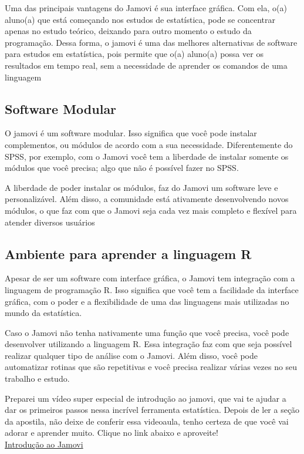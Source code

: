 Uma das principais vantagens do Jamovi é sua interface gráfica. Com ela, o(a) aluno(a) que está começando nos estudos de estatística, pode se concentrar apenas no estudo teórico, deixando para outro momento o estudo da programação. Dessa forma, o jamovi é uma das melhores alternativas de software para estudos em estatística, pois permite que o(a) aluno(a) possa ver os resultados em tempo real, sem a necessidade de aprender os comandos de uma linguagem

\subsection{Software Modular}

O jamovi é um software modular. Isso significa que você pode instalar complementos, ou módulos de acordo com a sua necessidade. Diferentemente do SPSS, por exemplo, com o Jamovi você tem a liberdade de instalar somente os módulos que você precisa; algo que não é possível fazer no SPSS.

A liberdade de poder instalar os módulos, faz do Jamovi um software leve e personalizável. Além disso, a comunidade está ativamente desenvolvendo novos módulos, o que faz com que o Jamovi seja cada vez mais completo e flexível para atender diversos usuários

\subsection{Ambiente para aprender a linguagem R}

Apesar de ser um software com interface gráfica, o Jamovi tem integração com a linguagem de programação R. Isso significa que você tem a facilidade da interface gráfica, com o poder e a flexibilidade de uma das linguagens mais utilizadas no mundo da estatística.

Caso o Jamovi não tenha nativamente uma função que você precisa, você pode desenvolver utilizando a linguagem R. Essa integração faz com que seja possível realizar qualquer tipo de análise com o Jamovi. Além disso, você pode automatizar rotinas que são repetitivas e você precisa realizar várias vezes no seu trabalho e estudo.

\begin{tcolorbox}[colback=white,colframe=green,title= Dica de Conteúdo]
  Preparei um vídeo super especial de introdução ao jamovi, que vai te ajudar a dar os primeiros passos nessa incrível ferramenta estatística. Depois de ler a seção da apostila, não deixe de conferir essa videoaula, tenho certeza de que você vai adorar e aprender muito. Clique no link abaixo e aproveite!\\
  \faYoutube{} \href{https://www.youtube.com/watch?v=0zGH20Fa_JA&t=2s}{Introdução ao Jamovi}
\end{tcolorbox}

